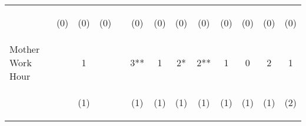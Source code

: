 \begin{tabular}{lcccccccccccc}
 & \begin{footnotesize}(0)\end{footnotesize} & \begin{footnotesize}(0)\end{footnotesize} & \begin{footnotesize}(0)\end{footnotesize} & \begin{footnotesize}\end{footnotesize} & \begin{footnotesize}(0)\end{footnotesize} & \begin{footnotesize}(0)\end{footnotesize} & \begin{footnotesize}(0)\end{footnotesize} & \begin{footnotesize}(0)\end{footnotesize} & \begin{footnotesize}(0)\end{footnotesize} & \begin{footnotesize}(0)\end{footnotesize} & \begin{footnotesize}(0)\end{footnotesize} & \begin{footnotesize}(0)\end{footnotesize}\\
\noalign{\smallskip}Mother Work Hour &  & 1 &  &  & 3** & 1 & 2* & 2** & 1 & 0 & 2 & 1\\
 & \begin{footnotesize}\end{footnotesize} & \begin{footnotesize}(1)\end{footnotesize} & \begin{footnotesize}\end{footnotesize} & \begin{footnotesize}\end{footnotesize} & \begin{footnotesize}(1)\end{footnotesize} & \begin{footnotesize}(1)\end{footnotesize} & \begin{footnotesize}(1)\end{footnotesize} & \begin{footnotesize}(1)\end{footnotesize} & \begin{footnotesize}(1)\end{footnotesize} & \begin{footnotesize}(1)\end{footnotesize} & \begin{footnotesize}(1)\end{footnotesize} & \begin{footnotesize}(2)\end{footnotesize}\\

\end{tabular}
